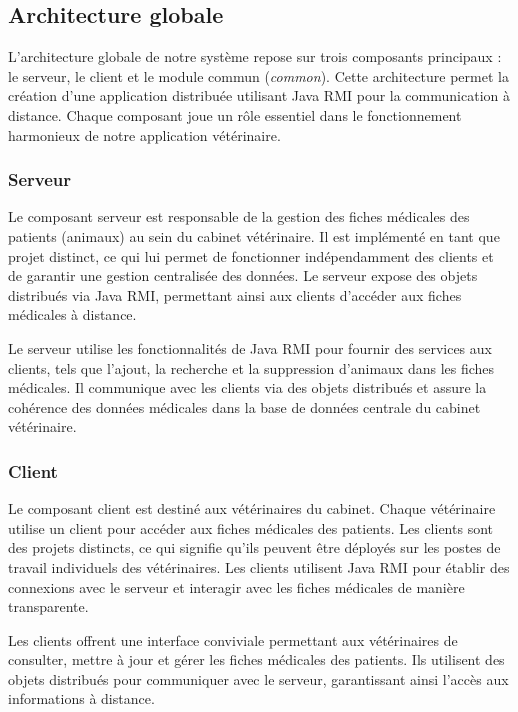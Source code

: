 \documentclass{article} %
\begin{document}
\subsection{Architecture globale}

L'architecture globale de notre système repose sur trois composants principaux : le serveur, le client et le module commun (\textit{common}). Cette architecture permet la création d'une application distribuée utilisant Java RMI pour la communication à distance. Chaque composant joue un rôle essentiel dans le fonctionnement harmonieux de notre application vétérinaire.

\subsubsection{Serveur}

Le composant serveur est responsable de la gestion des fiches médicales des patients (animaux) au sein du cabinet vétérinaire. Il est implémenté en tant que projet distinct, ce qui lui permet de fonctionner indépendamment des clients et de garantir une gestion centralisée des données. Le serveur expose des objets distribués via Java RMI, permettant ainsi aux clients d'accéder aux fiches médicales à distance.

Le serveur utilise les fonctionnalités de Java RMI pour fournir des services aux clients, tels que l'ajout, la recherche et la suppression d'animaux dans les fiches médicales. Il communique avec les clients via des objets distribués et assure la cohérence des données médicales dans la base de données centrale du cabinet vétérinaire.

\subsubsection{Client}

Le composant client est destiné aux vétérinaires du cabinet. Chaque vétérinaire utilise un client pour accéder aux fiches médicales des patients. Les clients sont des projets distincts, ce qui signifie qu'ils peuvent être déployés sur les postes de travail individuels des vétérinaires. Les clients utilisent Java RMI pour établir des connexions avec le serveur et interagir avec les fiches médicales de manière transparente.

Les clients offrent une interface conviviale permettant aux vétérinaires de consulter, mettre à jour et gérer les fiches médicales des patients. Ils utilisent des objets distribués pour communiquer avec le serveur, garantissant ainsi l'accès aux informations à distance.
\end{document}
